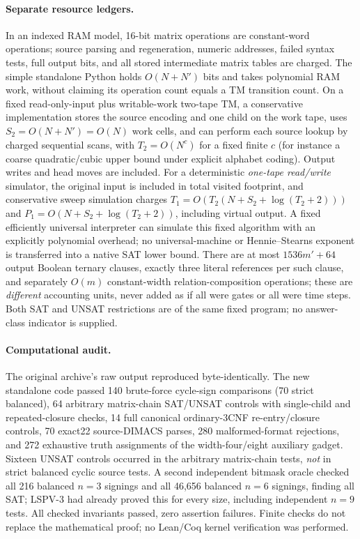 \documentclass[11pt]{article}
\begin{document}
\paragraph{Separate resource ledgers.} In an indexed RAM model, 16-bit matrix operations are constant-word operations; source parsing and regeneration, numeric addresses, failed syntax tests, full output bits, and all stored intermediate matrix tables are charged. The simple standalone Python holds $O(N+N')$ bits and takes polynomial RAM work, without claiming its operation count equals a TM transition count. On a fixed read-only-input plus writable-work two-tape TM, a conservative implementation stores the source encoding and one child on the work tape, uses $S_2=O(N+N')=O(N)$ work cells, and can perform each source lookup by charged sequential scans, with $T_2=O(N^c)$ for a fixed finite $c$ (for instance a coarse quadratic/cubic upper bound under explicit alphabet coding). Output writes and head moves are included. For a deterministic \emph{one-tape read/write} simulator, the original input is included in total visited footprint, and conservative sweep simulation charges $T_1=O(T_2(N+S_2+\log(T_2+2)))$ and $P_1=O(N+S_2+\log(T_2+2))$, including virtual output. A fixed efficiently universal interpreter can simulate this fixed algorithm with an explicitly polynomial overhead; no universal-machine or Hennie--Stearns exponent is transferred into a native SAT lower bound. There are at most $1536m'+64$ output Boolean ternary clauses, exactly three literal references per such clause, and separately $O(m)$ constant-width relation-composition operations; these are \emph{different} accounting units, never added as if all were gates or all were time steps. Both SAT and UNSAT restrictions are of the same fixed program; no answer-class indicator is supplied.

\paragraph{Computational audit.} The original archive's raw output reproduced byte-identically. The new standalone code passed 140 brute-force cycle-sign comparisons (70 strict balanced), 64 arbitrary matrix-chain SAT/UNSAT controls with single-child and repeated-closure checks, 14 full canonical ordinary-3CNF re-entry/closure controls, 70 exact22 source-DIMACS parses, 280 malformed-format rejections, and 272 exhaustive truth assignments of the width-four/eight auxiliary gadget. Sixteen UNSAT controls occurred in the arbitrary matrix-chain tests, \emph{not} in strict balanced cyclic source tests. A second independent bitmask oracle checked all 216 balanced $n=3$ signings and all 46,656 balanced $n=6$ signings, finding all SAT; LSPV-3 had already proved this for every size, including independent $n=9$ tests. All checked invariants passed, zero assertion failures. Finite checks do not replace the mathematical proof; no Lean/Coq kernel verification was performed.
\end{document}
